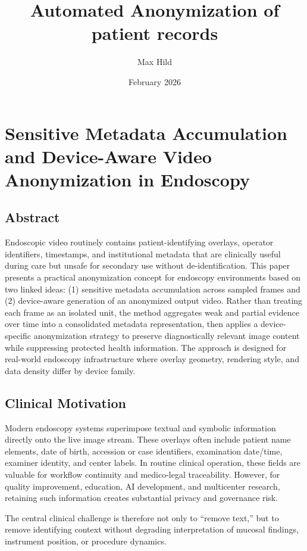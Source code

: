 \documentclass{article}
\begin{document}
\title{Automated Anonymization of patient records}
\author{Max Hild}
\date{February 2026}
\maketitle


\section{Sensitive Metadata Accumulation and Device-Aware Video Anonymization in Endoscopy}

\subsection{Abstract}
Endoscopic video routinely contains patient-identifying overlays, operator
identifiers, timestamps, and institutional metadata that are clinically useful
during care but unsafe for secondary use without de-identification. This paper
presents a practical anonymization concept for endoscopy environments based on
two linked ideas: (1) sensitive metadata accumulation across sampled frames and
(2) device-aware generation of an anonymized output video. Rather than treating
each frame as an isolated unit, the method aggregates weak and partial evidence
over time into a consolidated metadata representation, then applies a
device-specific anonymization strategy to preserve diagnostically relevant image
content while suppressing protected health information. The approach is designed
for real-world endoscopy infrastructure where overlay geometry, rendering style,
and data density differ by device family.

\subsection{Clinical Motivation}
Modern endoscopy systems superimpose textual and symbolic information directly
onto the live image stream. These overlays often include patient name elements,
date of birth, accession or case identifiers, examination date/time, examiner
identity, and center labels. In routine clinical operation, these fields are
valuable for workflow continuity and medico-legal traceability. However, for
quality improvement, education, AI development, and multicenter research,
retaining such information creates substantial privacy and governance risk.

The central clinical challenge is therefore not only to ``remove text,'' but to
remove identifying context without degrading interpretation of mucosal findings,
instrument position, or procedure dynamics.
\end{document}
